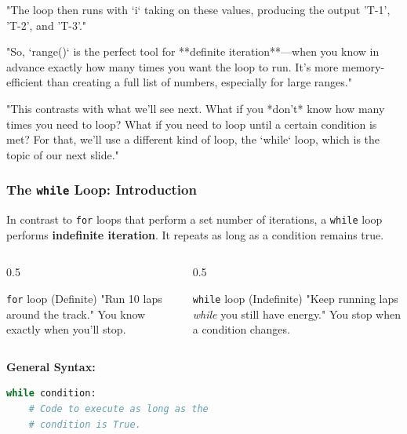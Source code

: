 \documentclass{beamer}
\begin{document}
\begin{frame}[fragile]
{    "The loop then runs with `i` taking on these values, producing the output 'T-1', 'T-2', and 'T-3'."
    
    "So, `range()` is the perfect tool for **definite iteration**—when you know in advance exactly how many times you want the loop to run. It's more memory-efficient than creating a full list of numbers, especially for large ranges."

    "This contrasts with what we'll see next. What if you *don't* know how many times you need to loop? What if you need to loop until a certain condition is met? For that, we'll use a different kind of loop, the `while` loop, which is the topic of our next slide."
    }
\end{frame}

\begin{frame}[fragile]
    \frametitle{The \texttt{while} Loop: Introduction}
    
    In contrast to \texttt{for} loops that perform a set number of iterations, a \texttt{while} loop performs \textbf{indefinite iteration}. It repeats as long as a condition remains true.
    
    \begin{columns}[T]
        \begin{column}{0.5\textwidth}
            \begin{block}{\texttt{for} loop (Definite)}
                "Run 10 laps around the track."
                \vspace{0.5em}
                You know exactly when you'll stop.
            \end{block}
        \end{column}
        \begin{column}{0.5\textwidth}
            \begin{block}{\texttt{while} loop (Indefinite)}
                "Keep running laps \textit{while} you still have energy."
                \vspace{0.5em}
                You stop when a condition changes.
            \end{block}
        \end{column}
    \end{columns}
    
    \vspace{1em}
    \textbf{General Syntax:}
    \begin{lstlisting}[language=Python]
while condition:
    # Code to execute as long as the
    # condition is True.


\end{lstlisting}
\end{frame}
\end{document}
